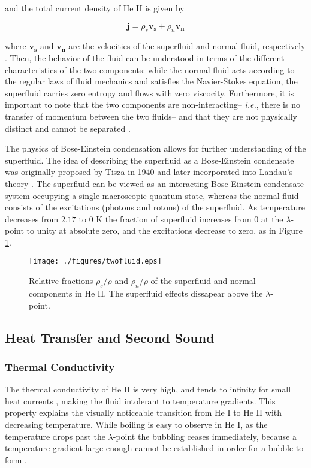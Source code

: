 and the total current density of He II is given by

\begin{equation}
\mathbf{j} = \rho_s\mathbf{v_s} + \rho_n\mathbf{v_n}
\end{equation}

where $\mathbf{v_s}$ and $\mathbf{v_n}$ are the velocities of the
superfluid and normal fluid, respectively \cite{tilley}. Then, the
behavior of the fluid can be understood in terms of the different
characteristics of the two components: while the normal fluid acts
according to the regular laws of fluid mechanics and satisfies the
Navier-Stokes equation, the superfluid carries zero entropy and flows
with zero viscocity. Furthermore, it is important to note that the two
components are non-interacting-- \emph{i.e.}, there is no transfer of
momentum between the two fluids-- and that they are
not physically distinct and cannot be separated \cite{tilley}.

The physics of Bose-Einstein condensation allows for further
understanding of the superfluid. The idea of describing the superfluid
as a Bose-Einstein condensate was originally proposed by Tisza in 1940
and later incorporated into Landau's theory \cite{tisza}. The
superfluid can be viewed as an interacting Bose-Einstein condensate
system occupying a single macroscopic quantum state, whereas the
normal fluid consists of the excitations (photons and rotons) of the
superfluid. As temperature decreases from $2.17$ to $0$ K the fraction
of superfluid increases from $0$ at the $\lambda$-point to unity at
absolute zero, and the excitations decrease to zero, as in Figure
\ref{figure:twofluid}\cite{andro}.

\begin{figure}[ht]
\begin{center}
\texttt{[image: ./figures/twofluid.eps]}
\caption{\small{Relative fractions $\rho_s/\rho$ and $\rho_n/\rho$ of
    the superfluid and normal components in He II\cite{andro}. The
    superfluid effects dissapear above the $\lambda$-point.}}
\label{figure:twofluid}
\end{center}
\end{figure}


\subsection{Heat Transfer and Second Sound}\label{heattransferandsecondsound}

\subsubsection{Thermal Conductivity}\label{thermalconductivity}
The thermal conductivity of He II is very high, and tends to infinity
for small heat currents \cite{tilley}, making the fluid intolerant
to temperature gradients. This property explains the visually
noticeable transition from He I to He II with decreasing temperature.
While boiling is easy to observe in He I, as the temperature drops
past the $\lambda$-point the bubbling ceases immediately, because a
temperature gradient large enough cannot be established in order for a
bubble to form \cite{tilley}.


